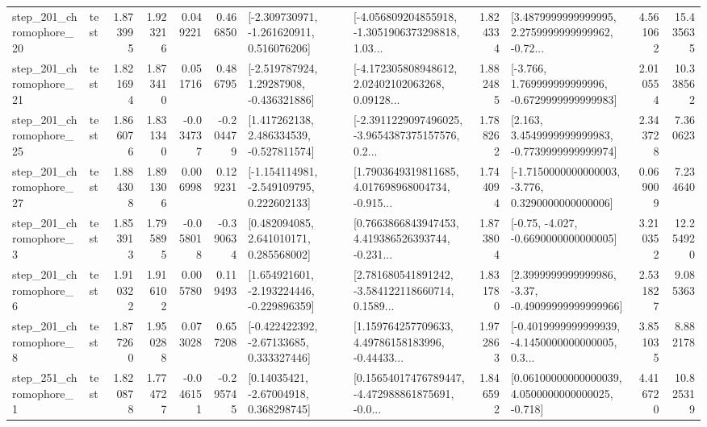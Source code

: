\begin{tabular}{llrrrrllrlrr}
  step\_201\_chromophore\_20 &      test &      1.873995 &    1.923216 &      0.049221 &  0.466850 &   [-2.309730971, -1.261620911, 0.516076206] &  [-4.056809204855918, -1.3051906373298818, 1.03... &       1.824334 &  [3.4879999999999995, 2.2759999999999962, -0.72... &            4.561062 &         15.435635 \\
  step\_201\_chromophore\_21 &      test &      1.821694 &    1.873410 &      0.051716 &  0.486795 &    [-2.519787924, 1.29287908, -0.436321886] &  [-4.172305808948612, 2.02402102063268, 0.09128... &       1.882485 &   [-3.766, 1.769999999999996, -0.6729999999999983] &            2.010554 &         10.338562 \\
  step\_201\_chromophore\_25 &      test &      1.866076 &    1.831340 &     -0.034737 & -0.204479 &    [1.417262138, 2.486334539, -0.527811574] &  [-2.3911229097496025, -3.9654387375157576, 0.2... &       1.788262 &   [2.163, 3.4549999999999983, -0.7739999999999974] &            2.343728 &          7.360623 \\
  step\_201\_chromophore\_27 &      test &      1.884308 &    1.891306 &      0.006998 &  0.129231 &   [-1.154114981, -2.549109795, 0.222602133] &  [1.7903649319811685, 4.017698968004734, -0.915... &       1.744094 &  [-1.7150000000000003, -3.776, 0.3290000000000006] &            0.069009 &          7.234640 \\
   step\_201\_chromophore\_3 &      test &      1.853913 &    1.795895 &     -0.058018 & -0.390634 &     [0.482094085, 2.641010171, 0.285568002] &  [0.7663866843947453, 4.419386526393744, -0.231... &       1.873804 &               [-0.75, -4.027, -0.6690000000000005] &            3.210352 &         12.254920 \\
   step\_201\_chromophore\_6 &      test &      1.910322 &    1.916102 &      0.005780 &  0.119493 &   [1.654921601, -2.193224446, -0.229896359] &  [2.781680541891242, -3.584122118660714, 0.1589... &       1.831780 &  [2.3999999999999986, -3.37, -0.49099999999999966] &            2.531827 &          9.085363 \\
   step\_201\_chromophore\_8 &      test &      1.877260 &    1.950288 &      0.073028 &  0.657208 &    [-0.422422392, -2.67133685, 0.333327446] &  [1.159764257709633, 4.49786158183996, -0.44433... &       1.972863 &  [-0.4019999999999939, -4.1450000000000005, 0.3... &            3.851035 &          8.882178 \\
   step\_251\_chromophore\_1 &      test &      1.820878 &    1.774727 &     -0.046151 & -0.295745 &      [0.14035421, -2.67004918, 0.368298745] &  [0.15654017476789447, -4.472988861875691, -0.0... &       1.846592 &  [0.06100000000000039, 4.0500000000000025, -0.718] &            4.416720 &         10.825319 \\

\end{tabular}
